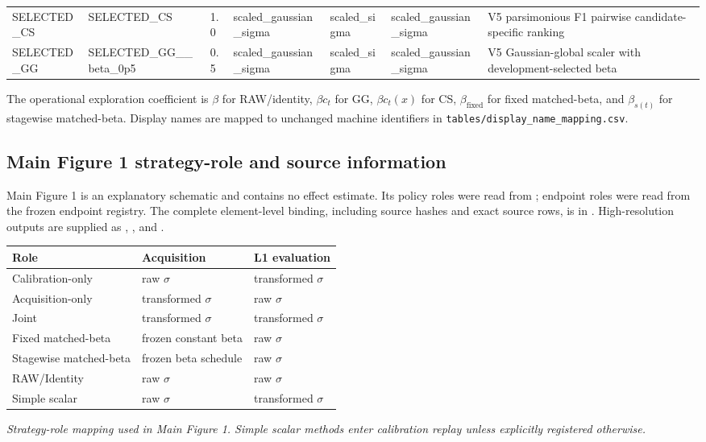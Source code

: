 \documentclass[10pt]{article}
\begin{document}
\begin{landscape}
\begin{longtable}{L{1.0in}L{1.0in}L{.7in}L{1.15in}L{1.15in}L{1.15in}L{1.65in}}
SELECTED\_\allowbreak{}CS & SELECTED\_\allowbreak{}CS & 1.0 & scaled\_\allowbreak{}gaussian\_\allowbreak{}sigma & scaled\_\allowbreak{}sigma & scaled\_\allowbreak{}gaussian\_\allowbreak{}sigma & V5 parsimonious F1 pairwise candidate-specific ranking\\
SELECTED\_\allowbreak{}GG & SELECTED\_\allowbreak{}GG\_\allowbreak{}\_\allowbreak{}beta\_\allowbreak{}0p5 & 0.5 & scaled\_\allowbreak{}gaussian\_\allowbreak{}sigma & scaled\_\allowbreak{}sigma & scaled\_\allowbreak{}gaussian\_\allowbreak{}sigma & V5 Gaussian-global scaler with development-selected beta\\
\bottomrule
\end{longtable}
\endgroup


The operational exploration coefficient is $\beta$ for RAW/identity, $\beta c_t$ for GG, $\beta c_t(x)$ for CS, $\beta_{\mathrm{fixed}}$ for fixed matched-beta, and $\beta_{s(t)}$ for stagewise matched-beta. Display names are mapped to unchanged machine identifiers in \texttt{tables/display\_name\_mapping.csv}.

\subsection{Main Figure 1 strategy-role and source information}
Main Figure 1 is an explanatory schematic and contains no effect estimate.
Its policy roles were read from
;
endpoint roles were read from the frozen endpoint registry. The complete
element-level binding, including source hashes and exact source rows, is in
. High-resolution
outputs are supplied as
,
, and
.

\begin{center}\small
\begin{tabular}{lll}
\toprule
Role & Acquisition & L1 evaluation\\
\midrule
Calibration-only & raw $\sigma$ & transformed $\sigma$\\
Acquisition-only & transformed $\sigma$ & raw $\sigma$\\
Joint & transformed $\sigma$ & transformed $\sigma$\\
Fixed matched-beta & frozen constant beta & raw $\sigma$\\
Stagewise matched-beta & frozen beta schedule & raw $\sigma$\\
RAW/Identity & raw $\sigma$ & raw $\sigma$\\
Simple scalar & raw $\sigma$ & transformed $\sigma$\\
\bottomrule
\end{tabular}
\par\smallskip\textit{Strategy-role mapping used in Main Figure 1. Simple
scalar methods enter calibration replay unless explicitly registered
otherwise.}
\end{center}
\end{landscape}
\end{document}
